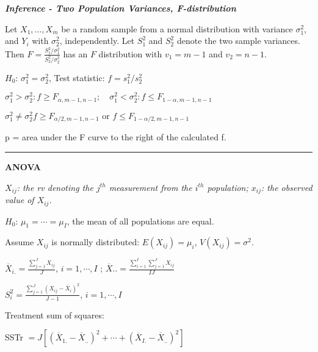 \documentclass{article}
\newcommand{\sectionline}{\color{black}\rule[2pt]{0.45\textwidth}{0.05em}\color{black}}
\newcommand{\bigtitle}[1]{
	\noindent
	\textbf{#1}
}
\newcommand{\smalltitle}[1]{
	\noindent
	\textbf{\textit{#1}}
}
\begin{document}
	
	\smalltitle{Inference - Two Population Variances, F-distribution}
	
	Let $X_1,\dots,X_m$ be a random sample from a normal distribution with variance $\sigma_1^2$, and $Y_i$ with $\sigma_2^2$, independently. Let $S_1^2$ and $S_2^2$ denote the two sample variances. Then $F = \frac { S _ { 1 } ^ { 2 } / \sigma _ { 1 } ^ { 2 } } { S _ { 2 } ^ { 2 } / \sigma _ { 2 } ^ { 2 } }$ has an $F$ distribution with $v_1 = m-1$ and $v_2 = n-1$. 
	
	$H_0$: $\sigma_1^2 = \sigma_2^2$, Test statistic: $f = s_1^2 / s_2^2$
	
	
	$
	{ \sigma _ { 1 } ^ { 2 } > \sigma _ { 2 } ^ { 2 } }    :                                { f \geq F _ { \alpha , m - 1 , n - 1 } }                                 ;\quad
	{ \sigma _ { 1 } ^ { 2 } < \sigma _ { 2 } ^ { 2 } }    :                                { f \leq F _ { 1 - \alpha , m - 1 , n - 1 } }                                 
	$
	
	$
	{ \sigma _ { 1 } ^ { 2 } \neq \sigma _ { 2 } ^ { 2 } }  { f \geq F _ { \alpha / 2 , m - 1 , n - 1 } \text { or } f \leq F _ { 1 - \alpha / 2 , m - 1 , n - 1 } }
	$
	
	
	p = area under the F curve to the right of the calculated f.
	
	\sectionline
	
	\bigtitle{ANOVA}
	
	\textit{$X_{ij}$: the rv denoting the $j^{th}$ measurement from the $i^{th}$ population; $x_{ij}$: the observed value of $X_{ij}$.}
	
	$H_0$: $\mu_1 = \cdots = \mu_I$, the mean of all populations are equal.
	
	\noindent
	Assume $X_{ij}$ is normally distributed: $E(X_{ij})=\mu_{i}$, $V ( X _ { i j } ) = \sigma ^ { 2 }$.
	
	$\overline { X } _ { i . } = \frac { \sum _ { j = 1 } ^ { J } X _ { i j } } { J }$, $i = 1,\cdots, I$ ; $\overline { X } . . = \frac { \sum _ { i = 1 } ^ { I } \sum _ { j = 1 } ^ { J } X _ { i j } } { I J }$
	
	$S _ { i } ^ { 2 } = \frac { \sum _ { j = 1 } ^ { J } \left( X _ { i j } - \overline { X } _ { i } \right) ^ { 2 } } { J - 1 }$, $i = 1,\cdots, I$
	
	Treatment sum of squares: 
	
	SSTr $ =  J \left[ \left( \overline { X } _ { 1 . } - \overline { X } _ { . . } \right) ^ { 2 } + \cdots + \left( \overline { X } _ { I . } - \overline { X } _ { . . } \right) ^ { 2 } \right]$
	
\end{document}
